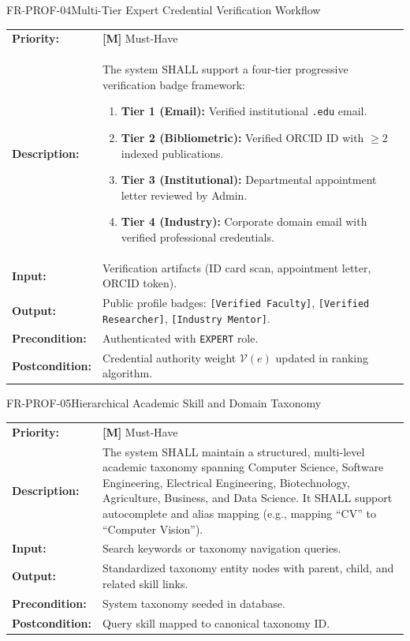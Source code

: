 \documentclass[11pt,a4paper]{article}
\begin{document}
\begin{reqbox}{FR-PROF-04}{Multi-Tier Expert Credential Verification Workflow}
\begin{tabularx}{\textwidth}{@{}lX@{}}
\textbf{Priority:} & \textbf{[M]} Must-Have \\
\textbf{Description:} & The system SHALL support a four-tier progressive verification badge framework:
\begin{enumerate}[noitemsep]
    \item \textbf{Tier 1 (Email):} Verified institutional \texttt{.edu} email.
    \item \textbf{Tier 2 (Bibliometric):} Verified ORCID ID with $\ge 2$ indexed publications.
    \item \textbf{Tier 3 (Institutional):} Departmental appointment letter reviewed by Admin.
    \item \textbf{Tier 4 (Industry):} Corporate domain email with verified professional credentials.
\end{enumerate} \\
\textbf{Input:} & Verification artifacts (ID card scan, appointment letter, ORCID token). \\
\textbf{Output:} & Public profile badges: \texttt{[Verified Faculty]}, \texttt{[Verified Researcher]}, \texttt{[Industry Mentor]}. \\
\textbf{Precondition:} & Authenticated with \texttt{EXPERT} role. \\
\textbf{Postcondition:} & Credential authority weight $\mathcal{V}(e)$ updated in ranking algorithm. \\
\end{tabularx}
\end{reqbox}

\begin{reqbox}{FR-PROF-05}{Hierarchical Academic Skill and Domain Taxonomy}
\begin{tabularx}{\textwidth}{@{}lX@{}}
\textbf{Priority:} & \textbf{[M]} Must-Have \\
\textbf{Description:} & The system SHALL maintain a structured, multi-level academic taxonomy spanning Computer Science, Software Engineering, Electrical Engineering, Biotechnology, Agriculture, Business, and Data Science. It SHALL support autocomplete and alias mapping (e.g., mapping ``CV'' to ``Computer Vision''). \\
\textbf{Input:} & Search keywords or taxonomy navigation queries. \\
\textbf{Output:} & Standardized taxonomy entity nodes with parent, child, and related skill links. \\
\textbf{Precondition:} & System taxonomy seeded in database. \\
\textbf{Postcondition:} & Query skill mapped to canonical taxonomy ID. \\
\end{tabularx}
\end{reqbox}
\end{document}
